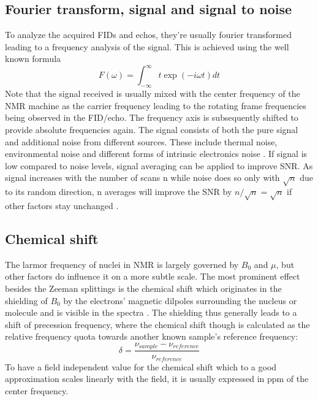         \subsection{Fourier transform, signal and signal to noise}
        \label{chapter:theory:fourierTransform}
        To analyze the acquired FIDs and echos, they're usually fourier transformed leading to a frequency analysis of the signal. This is achieved using the well known formula \cite{farrar_pulse_2012}
            \begin{equation}
            F(\omega) = \int^{\infty}_{-\infty}t \exp(-i\omega t)dt
            \end{equation}
            Note that the signal received is usually mixed with the center frequency of the NMR machine as the carrier frequency leading to the rotating frame frequencies being observed in the FID/echo. The frequency axis is subsequently shifted to provide absolute frequencies again.
            The signal consists of both the pure signal and additional noise from different sources. These include thermal noise, environmental noise and different forms of intrinsic electronics noise \cite{noauthor_henry_nodate}.
            If signal is low compared to noise levels, signal averaging can be applied to improve SNR. As signal increases with the number of scans n while noise does so only with $\sqrt n$ due to its random direction, n averages will improve the SNR by $n/\sqrt{n} = \sqrt{n}$ if other factors stay unchanged \cite{edelstein_intrinsic_1986}. 
        \subsection{Chemical shift}
            The larmor frequency of nuclei in NMR is largely governed by $B_0$ and $\mu$, but other factors do influence it on a more subtle scale. The most prominent effect besides the Zeeman splittings is the chemical shift which originates in the shielding of $B_0$ by the electrons' magnetic dilpoles surrounding the nucleus or molecule and is visible in the spectra \cite{gottlieb_nmr_1997}.  The shielding thus generally leads to a shift of precession frequency, where the chemical shift though is calculated as the relative frequency quota towards another known sample's reference frequency:
            \begin{equation}
                \delta = \frac{\nu_{sample} - \nu_{reference}}{\nu_{reference}}
            \end{equation}
            To have a field independent value for the chemical shift which to a good approximation scales linearly with the field, it is usually expressed in ppm of the center frequency.
